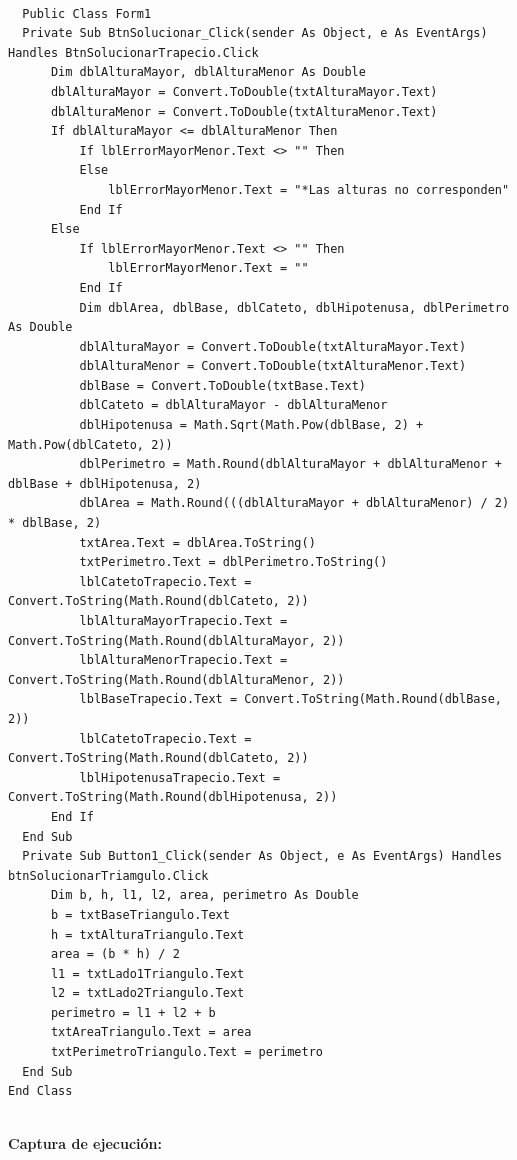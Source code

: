 \begin{lstlisting}[style=vbstyle]

  Public Class Form1
  Private Sub BtnSolucionar_Click(sender As Object, e As EventArgs) Handles BtnSolucionarTrapecio.Click
      Dim dblAlturaMayor, dblAlturaMenor As Double
      dblAlturaMayor = Convert.ToDouble(txtAlturaMayor.Text)
      dblAlturaMenor = Convert.ToDouble(txtAlturaMenor.Text)
      If dblAlturaMayor <= dblAlturaMenor Then
          If lblErrorMayorMenor.Text <> "" Then
          Else
              lblErrorMayorMenor.Text = "*Las alturas no corresponden"
          End If
      Else
          If lblErrorMayorMenor.Text <> "" Then
              lblErrorMayorMenor.Text = ""
          End If
          Dim dblArea, dblBase, dblCateto, dblHipotenusa, dblPerimetro As Double
          dblAlturaMayor = Convert.ToDouble(txtAlturaMayor.Text)
          dblAlturaMenor = Convert.ToDouble(txtAlturaMenor.Text)
          dblBase = Convert.ToDouble(txtBase.Text)
          dblCateto = dblAlturaMayor - dblAlturaMenor
          dblHipotenusa = Math.Sqrt(Math.Pow(dblBase, 2) + Math.Pow(dblCateto, 2))
          dblPerimetro = Math.Round(dblAlturaMayor + dblAlturaMenor + dblBase + dblHipotenusa, 2)
          dblArea = Math.Round(((dblAlturaMayor + dblAlturaMenor) / 2) * dblBase, 2)
          txtArea.Text = dblArea.ToString()
          txtPerimetro.Text = dblPerimetro.ToString()
          lblCatetoTrapecio.Text = Convert.ToString(Math.Round(dblCateto, 2))
          lblAlturaMayorTrapecio.Text = Convert.ToString(Math.Round(dblAlturaMayor, 2))
          lblAlturaMenorTrapecio.Text = Convert.ToString(Math.Round(dblAlturaMenor, 2))
          lblBaseTrapecio.Text = Convert.ToString(Math.Round(dblBase, 2))
          lblCatetoTrapecio.Text = Convert.ToString(Math.Round(dblCateto, 2))
          lblHipotenusaTrapecio.Text = Convert.ToString(Math.Round(dblHipotenusa, 2))
      End If
  End Sub
  Private Sub Button1_Click(sender As Object, e As EventArgs) Handles btnSolucionarTriamgulo.Click
      Dim b, h, l1, l2, area, perimetro As Double
      b = txtBaseTriangulo.Text
      h = txtAlturaTriangulo.Text
      area = (b * h) / 2
      l1 = txtLado1Triangulo.Text
      l2 = txtLado2Triangulo.Text
      perimetro = l1 + l2 + b
      txtAreaTriangulo.Text = area
      txtPerimetroTriangulo.Text = perimetro
  End Sub
End Class
  
\end{lstlisting}


\textbf{Captura de ejecución:}

